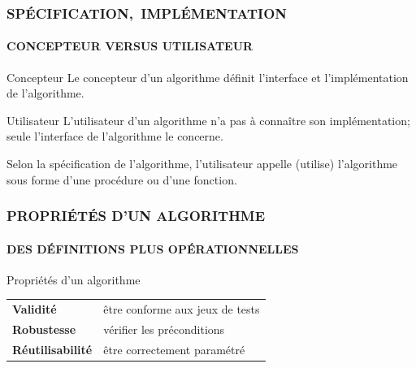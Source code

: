 \begin{frame}
\frametitle{\mbox{\uppercase{Spécification, implémentation}}}
\framesubtitle{\uppercase{Concepteur versus Utilisateur}}
\begin{block}{Concepteur}
Le concepteur d'un algorithme définit l'interface et 
l'implémentation de l'algorithme.
\end{block}
\begin{block}{Utilisateur}
L'utilisateur d'un algorithme n'a pas à connaître son
implémentation; seule l'interface de l'algorithme le concerne.

Selon la spécification de l'algorithme,
l'utilisateur \alert{appelle} (utilise) l'algorithme sous forme d'une
\alert{procédure} ou d'une \alert{fonction}.
\end{block}

\end{frame}
\note{}

\begin{frame}
\frametitle{\uppercase{Propriétés d'un algorithme}}
\framesubtitle{\uppercase{des définitions plus opérationnelles}}
\begin{block}{Propriétés d'un algorithme}
\begin{tabular}{l@{ : }l}
\bf Validité 		& être conforme aux jeux de tests\\
\bf Robustesse 		& vérifier les préconditions\\
\bf Réutilisabilité	& être correctement paramétré
\end{tabular}
\end{block} 

\end{frame}


